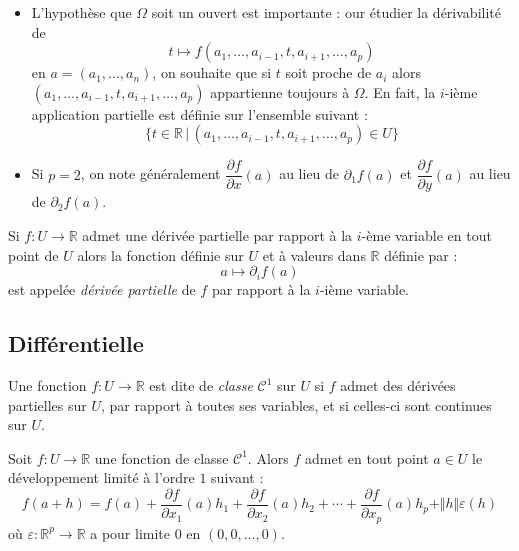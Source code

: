 \documentclass[french,11pt,twoside]{VcCours}
\begin{document}
\begin{Remarques}{}
\begin{itemize}
\item L'hypothèse que $\Omega$ soit un ouvert est importante : 
our étudier la dérivabilité de 
$$  t \mapsto f(a_1, \ldots, a_{i-1}, t, a_{i+1}, \ldots, a_p) $$
en $a=(a_1, \ldots, a_n)$, on souhaite que si $t$ soit proche de $a_i$ 
alors $(a_1, \ldots, a_{i-1}, t, a_{i+1}, \ldots, a_p)$ appartienne 
toujours à $\Omega$. En fait, la $i$-ième application partielle 
est définie sur l'ensemble suivant :
$$ \lbrace t \in \mathbb{R} \, \vert \, (a_1, \ldots, a_{i-1}, t, a_{i+1}, \ldots, a_p) \in U \rbrace$$
\item Si $p=2$, on note généralement $\dfrac{\partial f}{\partial x}(a)$ 
au lieu de $\partial_1 f(a)$ et $\dfrac{\partial f}{\partial y}(a)$ 
au lieu de $\partial_2 f(a)$.
\end{itemize}
\end{Remarques}

\begin{Definition}{} Si $f : U \rightarrow \mathbb{R}$ admet une dérivée partielle par rapport à la $i$-ème variable en tout point de $U$ alors la fonction définie sur $U$ et à valeurs dans $\mathbb{R}$ définie par :
$$ a \mapsto \partial_i f(a)$$
est appelée \emph{dérivée partielle} de $f$ par rapport à la $i$-ième variable.
\end{Definition}

\subsection{Différentielle}

\begin{Definition}{} Une fonction $f : U \rightarrow \mathbb{R}$ est dite de \emph{classe} $\mathcal{C}^1$ sur $U$ si $f$ admet des dérivées partielles sur $U$, par rapport à toutes ses variables, et si celles-ci sont continues sur $U$.
\end{Definition}

\begin{Theoreme}{} Soit $f: U \rightarrow \mathbb{R}$ une fonction de classe $\mathcal{C}^1$. Alors $f$ admet en tout point $a \in U$ le développement limité à l'ordre $1$ suivant :
$$ f(a+h) = f(a) + \dfrac{\partial f}{\partial x_1}(a) h_1 + \dfrac{\partial f}{\partial x_2}(a) h_2 + \cdots + \dfrac{\partial f}{\partial x_p}(a) h_p + \Vert h \Vert \varepsilon(h)$$
où $\varepsilon : \mathbb{R}^p \rightarrow \mathbb{R}$ a pour limite $0$ en $(0, 0, \ldots,0)$.
\end{Theoreme}
\end{document}

